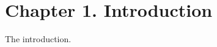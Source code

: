 \documentclass[../main.tex]{subfiles}
\begin{document}
	\section*{\centering Chapter 1. Introduction}
	The introduction.
	\clearpage
\end{document}
